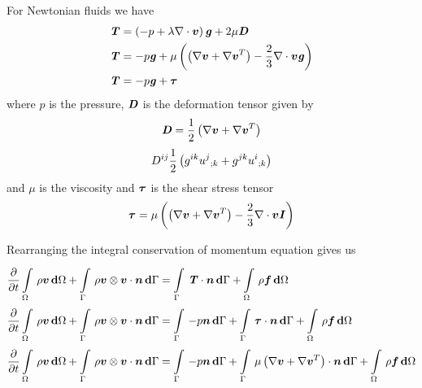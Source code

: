 For Newtonian fluids we have
\begin{equation}
  \begin{split}
    \tensor{T}&=\pbrac{-p+\lambda\divergence{}{\vectr{v}}}\tensor{g}+2\mu\tensor{D} \\
    \tensor{T}&=-p\tensor{g}+\mu\pbrac{\pbrac{\gradient{}{\vectr{v}}+\transpose{\gradient{}{\vectr{v}}}}-
      \frac{2}{3}\divergence{}{\vectr{v}}\tensor{g}}\\
    \tensor{T}&=-p\tensor{g}+\tensor{\tau}
  \end{split}
\end{equation}
where $p$ is the pressure, $\boldsymbol{\mathit{D}}$ is the deformation tensor given by
\begin{equation}
  \tensor{D}=\frac{1}{2}\pbrac{\gradient{}{\vectr{v}}+\transpose{\gradient{}{\vectr{v}}}}
\end{equation}
\or
\begin{equation}
  D^{ij}\frac{1}{2}\left( g^{ik} {u^{j}}_{;k} +g^{jk} {u^{i}}_{;k}  \right)
\end{equation}
and $\mu$ is the viscosity and $\boldsymbol{\mathit{\tau}}$ is the shear stress tensor \ie
\begin{equation}
  \tensor{\tau}=\mu\pbrac{\pbrac{\gradient{}{\vectr{v}}+\transpose{\gradient{}{\vectr{v}}}}-
    \frac{2}{3}\divergence{}{\vectr{v}}\tensor{I}}
\end{equation}

Rearranging the integral conservation of momentum equation gives us
\begin{equation}
  \begin{split}
    \delby{}{t}\gint{\Omega}{}{\rho\vectr{v}}{\Omega}
    +\gint{\Gamma}{}{\dotprod{\tensorprod{\rho\vectr{v}}{\vectr{v}}}{\vectr{n}}}{\Gamma}
    &=\gint{\Gamma}{}{\dotprod{\tensor{T}}{\vectr{n}}}{\Gamma}+\gint{\Omega}{}{\rho\vectr{f}}{\Omega}\\
    \delby{}{t}\gint{\Omega}{}{\rho\vectr{v}}{\Omega}
    +\gint{\Gamma}{}{\dotprod{\tensorprod{\rho\vectr{v}}{\vectr{v}}}{\vectr{n}}}{\Gamma}
    &=\gint{\Gamma}{}{-p\vectr{n}}{\Gamma}+\gint{\Gamma}{}{\dotprod{\tensor{\tau}}{\vectr{n}}}{\Gamma}
    +\gint{\Omega}{}{\rho\vectr{f}}{\Omega} \\
    \delby{}{t}\gint{\Omega}{}{\rho\vectr{v}}{\Omega}
    +\gint{\Gamma}{}{\dotprod{\tensorprod{\rho\vectr{v}}{\vectr{v}}}{\vectr{n}}}{\Gamma}
    &=\gint{\Gamma}{}{-p\vectr{n}}{\Gamma}+\gint{\Gamma}{}{\dotprod{\mu\pbrac{\gradient{}{\vectr{v}}
          +\transpose{\gradient{}{\vectr{v}}}}}{\vectr{n}}}{\Gamma}+\gint{\Omega}{}{\rho\vectr{f}}{\Omega} \\
  \end{split}
  \label{eqn:integralconservationofmomentum}
\end{equation}

